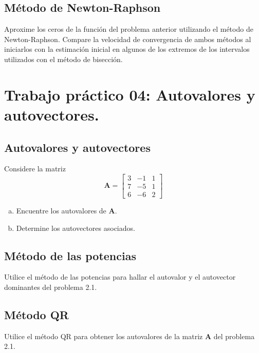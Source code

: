 \documentclass[11pt]{article}
\begin{document}
\subsection{Método de Newton-Raphson}
Aproxime los ceros de la función del problema anterior utilizando el método de Newton-Raphson. Compare la velocidad de convergencia de ambos métodos al iniciarlos con la estimación inicial en algunos de los extremos de los intervalos utilizados con el método de bisección.

\section{Trabajo práctico 04: Autovalores y autovectores.}

\subsection{Autovalores y autovectores} %
Considere la matriz 
\[
    \bm{A} = \begin{bmatrix}
        3 & -1 & 1 \\
        7 & -5 & 1 \\
    6 & -6 & 2 \end{bmatrix} \]
    \begin{enumerate}[a)]
        \item Encuentre los autovalores de $\bm{A}$.
        \item Determine los autovectores asociados.
    \end{enumerate}

\subsection{Método de las potencias}
Utilice el método de las potencias para hallar el autovalor y el autovector dominantes del problema 2.1.

\subsection{Método QR}
Utilice el método QR para obtener los autovalores de la matriz $\bm{A}$ del problema 2.1.
\end{document}
